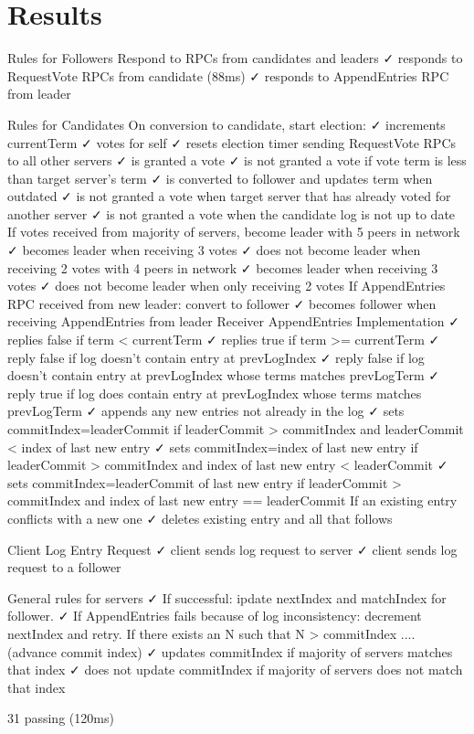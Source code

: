 \section{Results}
\label{sec:results_app}
\begin{small}
\begin{spverbatim}


  Rules for Followers
    Respond to RPCs from candidates and leaders
      ✓ responds to RequestVote RPCs from candidate (88ms)
      ✓ responds to AppendEntries RPC from leader 

  Rules for Candidates
    On conversion to candidate, start election:
      ✓ increments currentTerm 
      ✓ votes for self 
      ✓ resets election timer 
      sending RequestVote RPCs to all other servers
        ✓ is granted a vote 
        ✓ is not granted a vote if vote term is less than target server's term 
        ✓ is converted to follower and updates term when outdated 
        ✓ is not granted a vote when target server that has already voted for another server 
        ✓ is not granted a vote when the candidate log is not up to date 
    If votes received from majority of servers, become leader
      with 5 peers in network
        ✓ becomes leader when receiving 3 votes 
        ✓ does not become leader when receiving 2 votes 
      with 4 peers in network
        ✓ becomes leader when receiving 3 votes 
        ✓ does not become leader when only receiving 2 votes 
    If AppendEntries RPC received from new leader: convert to follower
      ✓ becomes follower when receiving AppendEntries from leader 
    Receiver AppendEntries Implementation
      ✓ replies false if term < currentTerm 
      ✓ replies true if term >= currentTerm 
      ✓ reply false if log doesn't contain entry at prevLogIndex 
      ✓ reply false if log doesn't contain entry at prevLogIndex whose terms matches prevLogTerm 
      ✓ reply true if log does contain entry at prevLogIndex whose terms matches prevLogTerm 
      ✓ appends any new entries not already in the log 
      ✓ sets commitIndex=leaderCommit if leaderCommit > commitIndex and leaderCommit < index of last new entry 
      ✓ sets commitIndex=index of last new entry if leaderCommit > commitIndex and index of last new entry < leaderCommit 
      ✓ sets commitIndex=leaderCommit of last new entry if leaderCommit > commitIndex and index of last new entry == leaderCommit 
      If an existing entry conflicts with a new one
        ✓ deletes existing entry and all that follows 

  Client Log Entry Request
    ✓ client sends log request to server 
    ✓ client sends log request to a follower 

  General rules for servers
    ✓ If successful: ipdate nextIndex and matchIndex for follower. 
    ✓ If AppendEntries fails because of log inconsistency: decrement nextIndex and retry. 
    If there exists an N such that N > commitIndex .... (advance commit index)
      ✓ updates commitIndex if majority of servers matches that index 
      ✓ does not update commitIndex if majority of servers does not match that index 


  31 passing (120ms)


\end{spverbatim}
\end{small}
